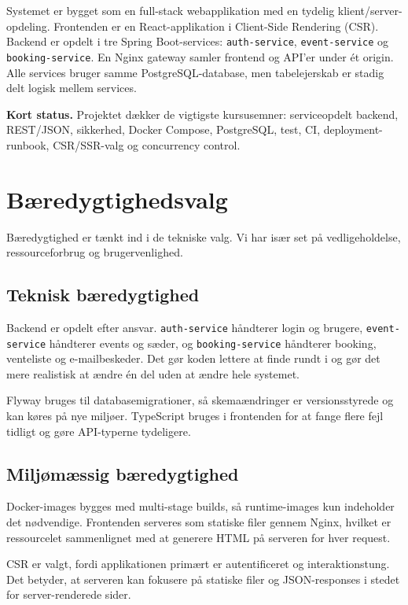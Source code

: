 \documentclass[11pt,a4paper]{article}
\newcommand{\code}[1]{\texttt{#1}}
\begin{document}
Systemet er bygget som en full-stack webapplikation med en tydelig klient/server-opdeling. Frontenden er en React-applikation i Client-Side Rendering (CSR). Backend er opdelt i tre Spring Boot-services: \code{auth-service}, \code{event-service} og \code{booking-service}. En Nginx gateway samler frontend og API'er under ét origin. Alle services bruger samme PostgreSQL-database, men tabelejerskab er stadig delt logisk mellem services.

\textbf{Kort status.} Projektet dækker de vigtigste kursusemner: serviceopdelt backend, REST/JSON, sikkerhed, Docker Compose, PostgreSQL, test, CI, deployment-runbook, CSR/SSR-valg og concurrency control.

\section{Bæredygtighedsvalg}

Bæredygtighed er tænkt ind i de tekniske valg. Vi har især set på vedligeholdelse, ressourceforbrug og brugervenlighed.

\subsection{Teknisk bæredygtighed}

Backend er opdelt efter ansvar. \code{auth-service} håndterer login og brugere, \code{event-service} håndterer events og sæder, og \code{booking-service} håndterer booking, venteliste og e-mailbeskeder. Det gør koden lettere at finde rundt i og gør det mere realistisk at ændre én del uden at ændre hele systemet.

Flyway bruges til databasemigrationer, så skemaændringer er versionsstyrede og kan køres på nye miljøer. TypeScript bruges i frontenden for at fange flere fejl tidligt og gøre API-typerne tydeligere.

\subsection{Miljømæssig bæredygtighed}

Docker-images bygges med multi-stage builds, så runtime-images kun indeholder det nødvendige. Frontenden serveres som statiske filer gennem Nginx, hvilket er ressourcelet sammenlignet med at generere HTML på serveren for hver request.

CSR er valgt, fordi applikationen primært er autentificeret og interaktionstung. Det betyder, at serveren kan fokusere på statiske filer og JSON-responses i stedet for server-renderede sider.
\end{document}
